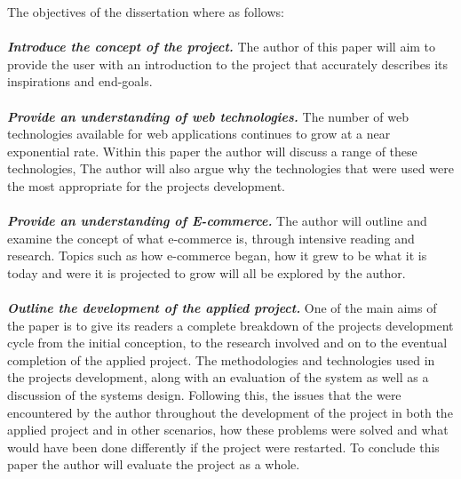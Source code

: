 The objectives of the dissertation where as follows: \\ \\
\textbf{\emph{Introduce the concept of the project.}} The author of this paper will aim to provide the user with an introduction to the project that accurately describes its inspirations and end-goals. \\ \\
\textbf{\emph{Provide an understanding of web technologies.}} The number of web technologies available for web applications continues to grow at a near exponential rate. Within this paper the author will discuss a range of these technologies, The author will also argue why the technologies that were used were the most appropriate for the projects development. \\ \\
\textbf{\emph{Provide an understanding of E-commerce.}} The author will outline and examine the concept of what e-commerce is, through intensive reading and research. Topics such as how e-commerce began, how it grew to be what it is today and were it is projected to grow will all be explored by the author. \\ \\
\textbf{\emph{Outline the development of the applied project.}} One of the main aims of the paper is to give its readers a complete breakdown of the projects development cycle from the initial conception, to the research involved and on to the eventual completion of the applied project. The methodologies and technologies used in the projects development, along with an evaluation of the system as well as a discussion of the systems design. Following this, the issues that the were encountered by the author throughout the development of the project in both the applied project and in other scenarios, how these problems were solved and what would have been done differently if the project were restarted. To conclude this paper the author will evaluate the project as a whole. \\ \\

